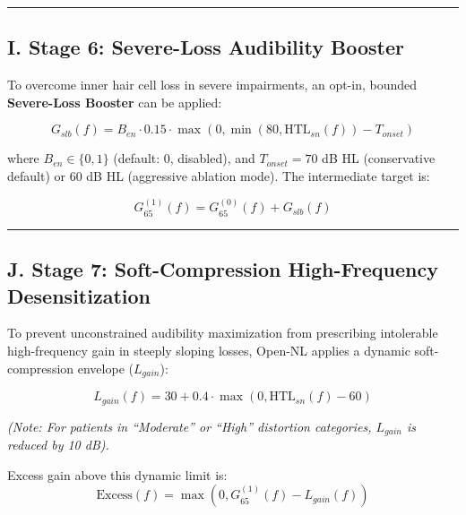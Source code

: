 \documentclass[
]{article}
\begin{document}
\begin{center}\rule{0.5\linewidth}{0.5pt}\end{center}

\subsection{I. Stage 6: Severe-Loss Audibility
Booster}\label{i.-stage-6-severe-loss-audibility-booster}

To overcome inner hair cell loss in severe impairments, an opt-in,
bounded \textbf{Severe-Loss Booster} can be applied:

\begin{equation}
G_{slb}(f) = B_{en} \cdot 0.15 \cdot \max\left(0, \min(80, \text{HTL}_{sn}(f)) - T_{onset}\right)
\end{equation}

where \(B_{en} \in \{0, 1\}\) (default: 0, disabled), and
\(T_{onset} = 70\) dB HL (conservative default) or \(60\) dB HL
(aggressive ablation mode). The intermediate target is:

\begin{equation}
G_{65}^{(1)}(f) = G_{65}^{(0)}(f) + G_{slb}(f)
\end{equation}

\begin{center}\rule{0.5\linewidth}{0.5pt}\end{center}

\subsection{J. Stage 7: Soft-Compression High-Frequency
Desensitization}\label{j.-stage-7-soft-compression-high-frequency-desensitization}

To prevent unconstrained audibility maximization from prescribing
intolerable high-frequency gain in steeply sloping losses, Open-NL
applies a dynamic soft-compression envelope (\(L_{gain}\)):

\begin{equation}
L_{gain}(f) = 30 + 0.4 \cdot \max\left(0, \text{HTL}_{sn}(f) - 60\right)
\end{equation}

\emph{(Note: For patients in ``Moderate'' or ``High'' distortion
categories, \(L_{gain}\) is reduced by 10 dB).}

Excess gain above this dynamic limit is: \begin{equation}
\text{Excess}(f) = \max\left(0, G_{65}^{(1)}(f) - L_{gain}(f)\right)
\end{equation}
\end{document}
